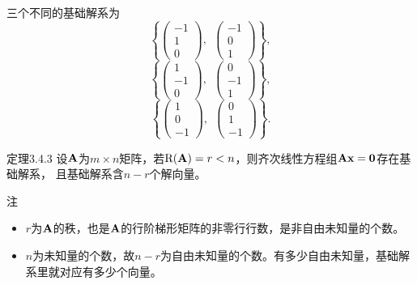 \begin{frame}
  \begin{footnotesize}
    三个不同的基础解系为
    $$
    \left\{
    \left(
    \begin{array}{r}
      -1\\1\\0
    \end{array}
    \right),~~
    \left(
    \begin{array}{r}
      -1\\0\\1
    \end{array}
    \right)
    \right\},
    $$
    $$
    \left\{
    \left(
    \begin{array}{r}
      1\\-1\\0
    \end{array}
    \right),~~
    \left(
    \begin{array}{r}
      0\\-1\\1
    \end{array}
    \right)
    \right\},
    $$
    $$
    \left\{
    \left(
    \begin{array}{r}
      1\\0\\-1
    \end{array}
    \right),~~
    \left(
    \begin{array}{r}
      0\\1\\-1
    \end{array}
    \right)
    \right\}.
    $$
  \end{footnotesize}
\end{frame}

\begin{frame}
  \begin{footnotesize}
    \begin{block}{定理3.4.3}
      设$\mathbf{A}$为$m\times n$矩阵，若$\mathrm{R}(\mathbf{A})=r<n$，则齐次线性方程组$\mathbf{A}\mathbf{x}=\mathbf{0}$存在基础解系，
      且基础解系含$n-r$个解向量。
    \end{block}
    \pause 
    \begin{block}{注}
      \begin{itemize}
      \item $r$为$\mathbf{A}$的秩，也是$\mathbf{A}$的行阶梯形矩阵的非零行行数，是非自由未知量的个数。\pause 
      \item $n$为未知量的个数，故$n-r$为自由未知量的个数。\pause 有多少自由未知量，基础解系里就对应有多少个向量。
      \end{itemize}
    \end{block}
  \end{footnotesize}
\end{frame}


